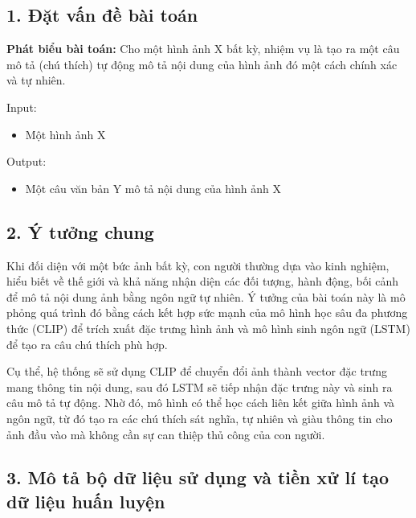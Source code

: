 \documentclass[../main.tex]{subfiles}
\begin{document}
\subsection*{1. Đặt vấn đề bài toán}

\textbf{Phát biểu bài toán:} Cho một hình ảnh X bất kỳ, nhiệm vụ là tạo ra một câu mô tả (chú thích) tự động mô tả nội dung của hình ảnh đó một cách chính xác và tự nhiên.

Input:
\begin{itemize}
    \item Một hình ảnh X
\end{itemize}

Output:
\begin{itemize}
    \item Một câu văn bản Y mô tả nội dung của hình ảnh X
\end{itemize}

\subsection*{2. Ý tưởng chung}

Khi đối diện với một bức ảnh bất kỳ, con người thường dựa vào kinh nghiệm, hiểu biết về thế giới và khả năng nhận diện các đối tượng, hành động, bối cảnh để mô tả nội dung ảnh bằng ngôn ngữ tự nhiên. Ý tưởng của bài toán này là mô phỏng quá trình đó bằng cách kết hợp sức mạnh của mô hình học sâu đa phương thức (CLIP) để trích xuất đặc trưng hình ảnh và mô hình sinh ngôn ngữ (LSTM) để tạo ra câu chú thích phù hợp.

Cụ thể, hệ thống sẽ sử dụng CLIP để chuyển đổi ảnh thành vector đặc trưng mang thông tin nội dung, sau đó LSTM sẽ tiếp nhận đặc trưng này và sinh ra câu mô tả tự động. Nhờ đó, mô hình có thể học cách liên kết giữa hình ảnh và ngôn ngữ, từ đó tạo ra các chú thích sát nghĩa, tự nhiên và giàu thông tin cho ảnh đầu vào mà không cần sự can thiệp thủ công của con người.

\subsection*{3. Mô tả bộ dữ liệu sử dụng và tiền xử lí tạo dữ liệu huấn luyện}
\end{document}
